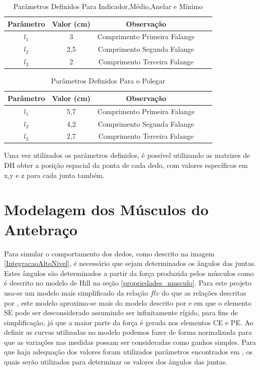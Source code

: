 \begin{table}[H]
\centering
\caption{Parâmetros Definidos Para Indicador,Médio,Anelar e Mínimo}
\label{ParamResto}
\begin{tabular}{|c|c|c|c|c|}
	\hline
    Parâmetro & Valor (cm) & Observação \\ \hline
    $l_1$ & 3 & Comprimento Primeira Falange \\ \hline
    $l_2$ & 2,5 & Comprimento Segunda Falange \\ \hline
    $l_3$ & 2 & Comprimento Terceira Falange \\ \hline
\end{tabular}
\end{table}

\begin{table}[H]
\centering
\caption{Parâmetros Definidos Para o Polegar}
\label{ParamPolegar}
\begin{tabular}{|c|c|c|c|c|}
	\hline
    Parâmetro & Valor (cm) & Observação \\ \hline
    $l_1$ & 5,7 & Comprimento Primeira Falange \\ \hline
    $l_2$ & 4,2 & Comprimento Segunda Falange \\ \hline
    $l_3$ & 2,7 & Comprimento Terceira Falange \\ \hline
\end{tabular}
\end{table}

Uma vez utilizados os parâmetros definidos, é possível utilizando as matrizes de DH obter a posição espacial da ponta de cada dedo, com valores específicos em x,y e z para cada junta também.

\section{Modelagem dos Músculos do Antebraço}
\label{modelagem_antebraco}
Para simular o comportamento dos dedos, como descrito na imagem \ref{IntegracaoAltoNivel}, é necessário que sejam determinados os ângulos das juntas. Estes ângulos são determinados a partir da força produzida pelos músculos como é descrito no modelo de Hill na seção \ref{propriedades_musculo}. Para este projeto usa-se um modelo mais simplificado da relação $flv$ do que as relações descritas por \cite{rosen1999performances}, este modelo aproxima-se mais do modelo descrito por \cite{zajac1989muscle} e \cite{durfee1994estimation} em que o elemento SE pode ser desconsiderado assumindo ser infinitamente rígido, para fins de simplificação, já que a maior parte da força é gerada nos elementos CE e PE. Ao definir as curvas utilizadas no modelo podemos fazer de forma normalizada para que as variações nas medidas possam ser consideradas como ganhos simples. Para que haja adequação dos valores foram utilizados parâmetros encontrados em \cite{lemay1996dynamic}, os quais serão utilizados para determinar os valores dos ângulos das juntas.

